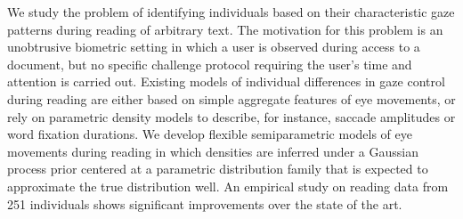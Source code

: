 We study the problem of identifying individuals based on their characteristic gaze patterns during reading of arbitrary text. The motivation for this problem is an unobtrusive biometric setting in which a user is observed during access to a document, but no specific challenge protocol requiring the user's time and attention is carried out. Existing models of individual differences in gaze control during reading are either based on simple aggregate features of eye movements, or rely on parametric density models to describe, for instance, saccade amplitudes or word fixation durations. We develop flexible semiparametric models of eye movements during reading in which densities are inferred under a Gaussian process prior centered at a parametric distribution family that is expected to approximate the true distribution well. An empirical study on reading data from 251 individuals shows significant improvements over the state of the art.
